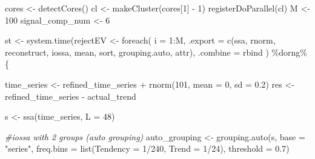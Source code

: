 \documentclass[
]{article}
\newenvironment{Shaded}{\begin{snugshade}}{\end{snugshade}}
\newcommand{\AttributeTok}[1]{\textcolor[rgb]{0.77,0.63,0.00}{#1}}
\newcommand{\CommentTok}[1]{\textcolor[rgb]{0.56,0.35,0.01}{\textit{#1}}}
\newcommand{\DecValTok}[1]{\textcolor[rgb]{0.00,0.00,0.81}{#1}}
\newcommand{\FloatTok}[1]{\textcolor[rgb]{0.00,0.00,0.81}{#1}}
\newcommand{\FunctionTok}[1]{\textcolor[rgb]{0.00,0.00,0.00}{#1}}
\newcommand{\NormalTok}[1]{#1}
\newcommand{\OtherTok}[1]{\textcolor[rgb]{0.56,0.35,0.01}{#1}}
\newcommand{\SpecialCharTok}[1]{\textcolor[rgb]{0.00,0.00,0.00}{#1}}
\newcommand{\StringTok}[1]{\textcolor[rgb]{0.31,0.60,0.02}{#1}}
\begin{document}
\begin{Shaded}
\begin{Highlighting}[]
\NormalTok{  cores }\OtherTok{\textless{}{-}} \FunctionTok{detectCores}\NormalTok{()}
\NormalTok{  cl }\OtherTok{\textless{}{-}} \FunctionTok{makeCluster}\NormalTok{(cores[}\DecValTok{1}\NormalTok{] }\SpecialCharTok{{-}} \DecValTok{1}\NormalTok{)}
  \FunctionTok{registerDoParallel}\NormalTok{(cl)}
\NormalTok{  M }\OtherTok{\textless{}{-}} \DecValTok{100}
\NormalTok{  signal\_comp\_num }\OtherTok{\textless{}{-}} \DecValTok{6}
  
\NormalTok{  st }\OtherTok{\textless{}{-}} \FunctionTok{system.time}\NormalTok{(rejectEV }\OtherTok{\textless{}{-}} \FunctionTok{foreach}\NormalTok{(}
    \AttributeTok{i =} \DecValTok{1}\SpecialCharTok{:}\NormalTok{M,}
    \AttributeTok{.export =} \FunctionTok{c}\NormalTok{(}\StringTok{\textquotesingle{}ssa\textquotesingle{}}\NormalTok{, }\StringTok{\textquotesingle{}rnorm\textquotesingle{}}\NormalTok{, }\StringTok{\textquotesingle{}reconstruct\textquotesingle{}}\NormalTok{, }\StringTok{\textquotesingle{}iossa\textquotesingle{}}\NormalTok{, }\StringTok{\textquotesingle{}mean\textquotesingle{}}\NormalTok{, }\StringTok{\textquotesingle{}sort\textquotesingle{}}\NormalTok{, }\StringTok{\textquotesingle{}grouping.auto\textquotesingle{}}\NormalTok{, }\StringTok{\textquotesingle{}attr\textquotesingle{}}\NormalTok{),}
    \AttributeTok{.combine =}\NormalTok{ rbind}
\NormalTok{  ) }\SpecialCharTok{\%dorng\%}\NormalTok{ \{}
    
\NormalTok{    time\_series }\OtherTok{\textless{}{-}}\NormalTok{ refined\_time\_series }\SpecialCharTok{+} \FunctionTok{rnorm}\NormalTok{(}\DecValTok{101}\NormalTok{, }\AttributeTok{mean =} \DecValTok{0}\NormalTok{, }\AttributeTok{sd =} \FloatTok{0.2}\NormalTok{)}
\NormalTok{    res }\OtherTok{\textless{}{-}}\NormalTok{ refined\_time\_series }\SpecialCharTok{{-}}\NormalTok{ actual\_trend}
    
\NormalTok{    s }\OtherTok{\textless{}{-}} \FunctionTok{ssa}\NormalTok{(time\_series, }\AttributeTok{L =} \DecValTok{48}\NormalTok{)}
    
    \CommentTok{\#iossa with 2 groups (auto grouping)}
\NormalTok{    auto\_grouping }\OtherTok{\textless{}{-}} \FunctionTok{grouping.auto}\NormalTok{(s, }\AttributeTok{base =} \StringTok{"series"}\NormalTok{, }
                    \AttributeTok{freq.bins =} \FunctionTok{list}\NormalTok{(}\AttributeTok{Tendency =} \DecValTok{1}\SpecialCharTok{/}\DecValTok{240}\NormalTok{, }\AttributeTok{Trend =} \DecValTok{1}\SpecialCharTok{/}\DecValTok{24}\NormalTok{), }
                    \AttributeTok{threshold =} \FloatTok{0.7}\NormalTok{)}
    

\end{Highlighting}
\end{Shaded}
\end{document}
